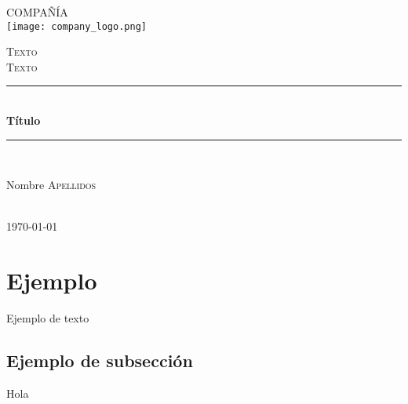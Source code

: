 \documentclass[a4paper]{article} %
\newcommand{\HRule}{\rule{\linewidth}{0.5mm}} %
\begin{document}
    \begin{titlepage}
        \centering
        \textsc{\LARGE COMPAÑÍA}\\[1.5cm] %
        \texttt{[image: company\_logo.png]}\par\vspace{1cm} %
        \textsc{\Large Texto}\\[0.5cm] %
        \textsc{\large Texto}\\[0.5cm] %
        \HRule \\[0.4cm]
        {\huge \bfseries Título}\\[0.4cm] %
        \HRule \\[1.5cm]
        \begin{minipage}{0.75\textwidth}
        \begin{flushleft} \large
            \centering
            Nombre \textsc{Apellidos}\\ %
        \end{flushleft}
        \end{minipage}\\[2cm]
        {\large \today}\\[2cm] %
        \vfill %
        
    \clearpage
    \end{titlepage}

    \setlength{\headheight}{41.75pt}
	
    \pagestyle{fancy}
    \fancyhf
    \fancyhead{\ }
    \renewcommand{\headrulewidth}{3pt} %

    \tableofcontents
    \clearpage

    \section{Ejemplo}
    Ejemplo de texto
        \subsection{Ejemplo de subsección}
        Hola
\end{document}
